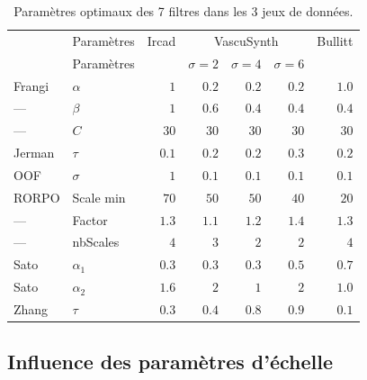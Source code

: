 \begin{table}[!ht]
 
  \begin{center}
  \caption{Paramètres optimaux des 7 filtres dans les 3 jeux de données.}
      \begin{tabular}{llrrrrr}
                          \hline
             & Paramètres  & Ircad       &  \multicolumn{3}{c}{VascuSynth}            &  Bullitt\\
             & Paramètres  &         & $\sigma = 2$  & $\sigma = 4$ & $\sigma = 6$ &       \\
                         \hline
      Frangi &  $\alpha$  & $1$         & $0.2$     & $0.2$        & $0.2$           & $1.0$   \\
      ---    &  $\beta$   & $1$         & $0.6$     & $0.4$       & $0.4$           & $0.4$   \\
      ---    &  $C$       & $30$        & $30$       & $30$         & $30$            & $30$    \\
      Jerman & $\tau$     & $0.1$       & $0.2$     & $0.2$       & $0.3$          & $0.2$  \\
      OOF &  $\sigma$     & $1$         & $0.1$      & $0.1$        & $0.1$           & $0.1$   \\
      RORPO  & Scale min  & $70$        & $50$       & $50$         & $40$            & $20$    \\
      ---    &Factor      & $1.3$       & $1.1$     & $1.2$       & $1.4$          & $1.3$  \\
      ---    &  nbScales  & $4$         & $3$        & $2$          & $2$             & $4$     \\
      Sato   & $\alpha_1$ & $0.3$       & $0.3$      & $0.3$        & $0.5$          & $0.7$   \\
      Sato   & $\alpha_2$ & $1.6$       & $2$      & $1$        & $2$           & $1.0$   \\
      Zhang  & $\tau$     & $0.3$       & $0.4$     & $0.8$       & $0.9$          & $0.1$  \\
          \hline
      \end{tabular}
  \label{tab:optimal_parameters}
  \end{center}
\end{table}


\subsection{Influence des paramètres d'échelle}


